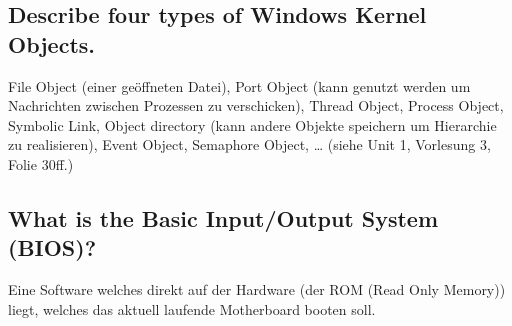 \subsection{Describe four types of Windows Kernel Objects.}
File Object (einer geöffneten Datei), Port Object (kann genutzt werden um Nachrichten zwischen Prozessen zu verschicken), Thread Object, Process Object, Symbolic Link, Object directory (kann andere Objekte speichern um Hierarchie zu realisieren), Event Object, Semaphore Object, \dots
(siehe Unit 1, Vorlesung 3, Folie 30ff.)

\subsection{What is the Basic Input/Output System (BIOS)?}
Eine Software welches direkt auf der Hardware (der ROM (Read Only Memory)) liegt, welches das aktuell laufende Motherboard booten soll.
